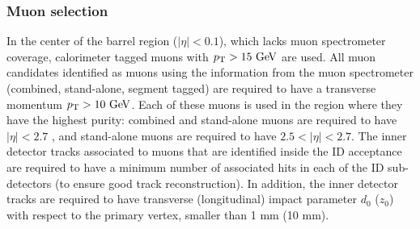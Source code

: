 \subsubsection*{Muon selection}
In the center of the barrel region ($|\eta| < 0.1$), which lacks muon spectrometer
coverage, calorimeter tagged muons with $\pt > 15 \GeV$ are used. All muon candidates
identified as muons using the information from the muon spectrometer (combined,
stand-alone, segment tagged) are required  to have a transverse momentum 
$\pt > 10 \GeV$. Each of these muons is used in the region where they have
the highest purity: combined and stand-alone muons are required to have $|\eta| < 2.7$
, and stand-alone muons are required to have $2.5 < |\eta| < 2.7$. The inner
detector tracks associated to muons that are identified inside the ID acceptance are
required to have a minimum number of associated hits in each of the ID sub-detectors
(to ensure good track reconstruction). 
In addition, the inner
detector tracks are required to have transverse (longitudinal) impact parameter
$d_0$ ($z_0$) with respect to the primary vertex, smaller than 1 mm (10 mm).

